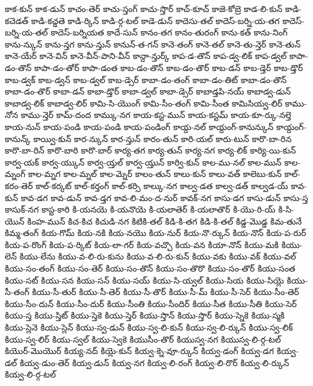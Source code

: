 {కాక-కున్
కాక-డున్
కాచం-తెర్
కాచు-స్తంగ్
కాచు-స్తొర్
కాచ్-కూచ్
కాజె-కోబ్రె
కాడ-లి-కున్
కాడి-కచెడత్
కాడి-కచ్డతె
కాడి-ర్కిన్
కాడి-ర్గ-టల్
కాడె-డున్
కాదెసు-తల్
కాదెస్-బర్ని-య-తగ
కాదెస్-బర్ని-య-తల్
కాదెస్-బర్నియత
కాదే-సున్
కానం-తగ
కానం-తురంగ్
కాను-కత్
కాను-నింగ్
కాను-న్కున్
కాను-న్తగ
కాను-న్తున్
కానున్-త-గన్
కానె-తంగ్
కానె-తల్
కానె-తు-న్తెర్
కానె-తున్
కానె-యేర్
కానె-విన్
కానె-వీన్-పాని-వీన్
కాన్దా-న్తుర్క్
కాప-డ-తొన్
కాప-డ్వ-లిక్
కాప-డ్వల్
కాపా-డం-తొన్
కాపా-డం-తోర్
కాపా-డంత
కాబ-డం-తొన్
కాబ-డం-తొర్
కాబ-డన్
కాబ-డ్తెర్
కాబ-డ్తొర్
కాబ-డ్వక్
కాబ-డ్వన్
కాబ-డ్వల్
కాబ-డ్సెర్
కాబా-డం-తంగ్
కాబా-డం-తిట్
కాబా-డం-తొన్
కాబా-డం-తొర్
కాబా-డన్
కాబా-డ్తొర్
కాబా-డ్వల్
కాబా-డ్సెర్
కాబాడ్తపి-నయ్
కాబాడ్వ-డున్
కాబాడ్వ-లిక్
కాబాడ్వ-లిర్
కామి-సి-యొంగ్
కామి-సీం-తంగ్
కామి-సీంత
కామిసియ్వ-లిర్
కాము-నోన
కాము-న్తెర్
కామ్-దంద
కామ్కు-నగ
కాయ-కస్ట-మున్
కాయ-కస్టమ్
కాయ-కూ-ర్కు-నల్తె
కాయ-నున్
కాయ-పండి
కాయ-పండి
కాయ-పండింగ్
కాయ్ద-నల్
కాయ్దంగ్-కానున్కున్
కాయ్దంగ్-కానున్క్
కాయ్వి-కున్
కార-న్కున్
కార-న్తున్
కారం-తున్
కారి-యల్
కారు-టున్
కారొ-బా-రిన
కారొ-బా-రిన్
కారొ-బారి
కారొ-బార్
కార్య-తగ
కార్య-తున్
కార్య-నగ
కార్య-లిక్
కార్యి-యి-కున్
కార్వ-యక్
కార్వ-య్కున్
కార్వ-య్తల్
కార్వ-య్తున్
కార్వి-కున్
కాల-ము-నల్
కాల-మున్
కాల-మ్నంగ్
కాల-మ్నగ
కాల-మ్నల్
కాల-మ్నెర్
కాలం-తున్
కాలు-కున్
కాలు-వత్
కాలెబు-కున్
కాల్-కరం-తెర్
కాల్-కర్కట్
కాల్-కర్తంగ్
కాల్-కర్సి
కాల్కు-నగ
కాల్వ-డత
కాల్వ-డత్
కాల్వడ-య్
కావ-కున్
కావ-డగ
కావ-డున్
కావ-డ్తగ
కావ-లి-మం-ద-నుర్
కావక్-నగ
కాసు-డగ
కాసు-డున్
కాసు-స్త
కాసుక్-నగ
కాస్ట-కారి
కి-యనయె
కి-యనొయె
కి-యలాతెర్
కి-యలాతొర్
కి-యొ-రి-య్
కి-సి-యొన్
కింహ-మున్
కిచ-కిచ
కిచుడి-నగ
కిటికి-తల్
కిడి-కి-తగ
కిడి-కి-తల్
కిడ్డ-మొడ్డ
కిమ-తునే
కిమ్మ-తంగ్
కియ-గొమ్
కియ-నకి
కియ-నయొ
కియ-నుర్
కియ-నొ-ర్కున్
కియ-నొన్
కియ-ప-రుర్
కియ-ప-రొంగ్
కియ-ప-ర్కిట్
కియ-లా-గర్
కియ-వచ్చొ
కియ-వన
కియా-నొన్
కియు-మకి
కియు-లెన్
కియు-లేను
కియు-వ-లి-రు-కును
కియు-వ-లి-రు-కున్
కియు-వకు
కియు-వక్
కియు-వల్
కియు-సం-తంగ్
కియు-సం-తెర్
కియు-సం-తొన్
కియు-సం-తొరొ
కియు-సం-తొర్
కియు-సంత
కియు-సట్
కియు-సన
కియు-సన్
కియు-సయ్
కియు-సి-య్వల్
కియు-సియ
కియు-సియ్లె
కియు-సీ-తంగ్
కియు-సీ-తుర్
కియు-సీ-తెర్
కియు-సీ-తొర్
కియు-సీ-మ్
కియు-సీ-సెర్
కియు-సీం-తెర్
కియు-సీం-దున్
కియు-సీం-దుర్
కియు-సీంతి
కియు-సీందిర్
కియు-సీత
కియు-సీతి
కియు-సెర్
కియు-స్త
కియు-స్తిట్
కియు-స్తెకె
కియు-స్తెర్
కియు-స్తొన్
కియు-స్తొర్
కియు-స్నెకె
కియు-స్మకి
కియు-స్లెనె
కియు-స్లెన్
కియు-స్వ-డున్
కియు-స్వ-లి-కున్
కియు-స్వ-లి-ర్కున్
కియు-స్వ-లిక్
కియు-స్వ-లిర్
కియు-స్వల్
కియు-స్వెకె
కియుసీం-తొర్
కియుస్వ-నగ
కియుస్వ-లి-ర్గ-టల్
కియొర్-మొయొర్
కియ్య-నద్
కియ్లె-కున్
కియ్వ-క్నె-వూ-ర్కున్
కియ్వ-డంగ్
కియ్వ-డగ
కియ్వ-డల్
కియ్వ-డుం-తెర్
కియ్వ-డున్
కియ్వ-నగ
కియ్వ-లి-రంగ్
కియ్వ-లి-రొర్
కియ్వ-లి-ర్కున్
కియ్వ-లి-ర్గ-టల్
}
